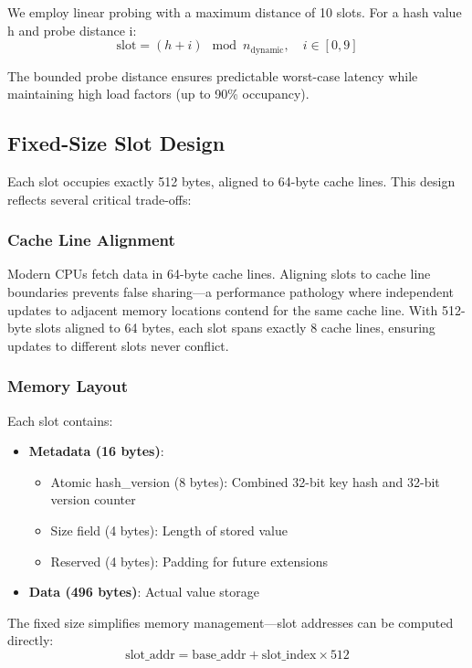 \documentclass[11pt]{article}
\begin{document}
We employ linear probing with a maximum distance of 10 slots. For a hash value h and probe distance i:
\begin{equation}
\text{slot} = (h + i) \mod n_{\text{dynamic}}, \quad i \in [0, 9]
\end{equation}

The bounded probe distance ensures predictable worst-case latency while maintaining high load factors (up to 90\% occupancy).

\subsection{Fixed-Size Slot Design}

Each slot occupies exactly 512 bytes, aligned to 64-byte cache lines. This design reflects several critical trade-offs:

\subsubsection{Cache Line Alignment}
Modern CPUs fetch data in 64-byte cache lines. Aligning slots to cache line boundaries prevents false sharing—a performance pathology where independent updates to adjacent memory locations contend for the same cache line. With 512-byte slots aligned to 64 bytes, each slot spans exactly 8 cache lines, ensuring updates to different slots never conflict.

\subsubsection{Memory Layout}
Each slot contains:
\begin{itemize}
\item \textbf{Metadata (16 bytes)}:
  \begin{itemize}
  \item Atomic hash\_version (8 bytes): Combined 32-bit key hash and 32-bit version counter
  \item Size field (4 bytes): Length of stored value
  \item Reserved (4 bytes): Padding for future extensions
  \end{itemize}
\item \textbf{Data (496 bytes)}: Actual value storage
\end{itemize}

The fixed size simplifies memory management—slot addresses can be computed directly:
\begin{equation}
\text{slot\_addr} = \text{base\_addr} + \text{slot\_index} \times 512
\end{equation}
\end{document}
